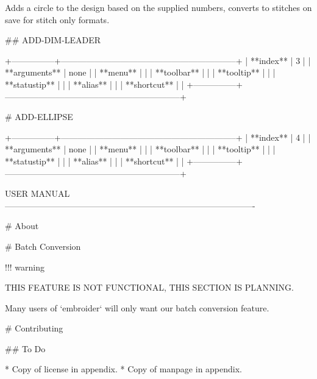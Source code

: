Adds a circle to the design based on the supplied numbers, converts to stitches
on save for stitch only formats.

## ADD-DIM-LEADER

+---------------+--------------------------------------------------------------+
| **index**     | 3                                                            |
| **arguments** | none                                                         |
| **menu**      |                                                              |
| **toolbar**   |                                                              |
| **tooltip**   |                                                              |
| **statustip** |                                                              |
| **alias**     |                                                              |
| **shortcut**  |                                                              |
+---------------+--------------------------------------------------------------+

# ADD-ELLIPSE

+---------------+--------------------------------------------------------------+
| **index**     | 4                                                            |
| **arguments** | none                                                         |
| **menu**      |                                                              |
| **toolbar**   |                                                              |
| **tooltip**   |                                                              |
| **statustip** |                                                              |
| **alias**     |                                                              |
| **shortcut**  |                                                              |
+---------------+--------------------------------------------------------------+

USER MANUAL
----------------------------------------------------------------------------------------

# About

# Batch Conversion

!!! warning

    THIS FEATURE IS NOT FUNCTIONAL, THIS SECTION IS PLANNING.

Many users of `embroider` will only want our batch conversion feature.

# Contributing

## To Do

* Copy of license in appendix.
* Copy of manpage in appendix.

